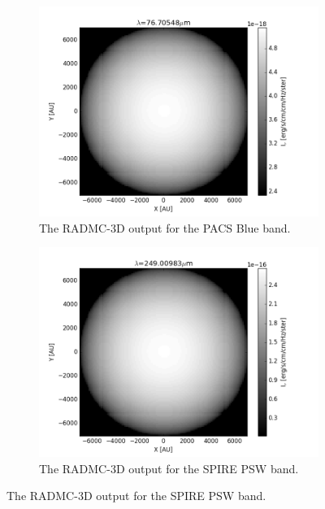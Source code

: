 \documentclass{report}
\begin{document}
\begin{figure}
\centering

\begin{subfigure}[b]{.45\linewidth}
\includegraphics[width=\linewidth]{../img/output/blue.png}
\caption{The RADMC-3D output for the PACS Blue band.}\label{fig:iso-blue}
\end{subfigure}
\begin{subfigure}[b]{.45\linewidth}
\includegraphics[width=\linewidth]{../img/output/psw.png}
\caption{The RADMC-3D output for the SPIRE PSW band.}\label{fig:iso-psw}
\end{subfigure}


\end{figure}
\end{document}

